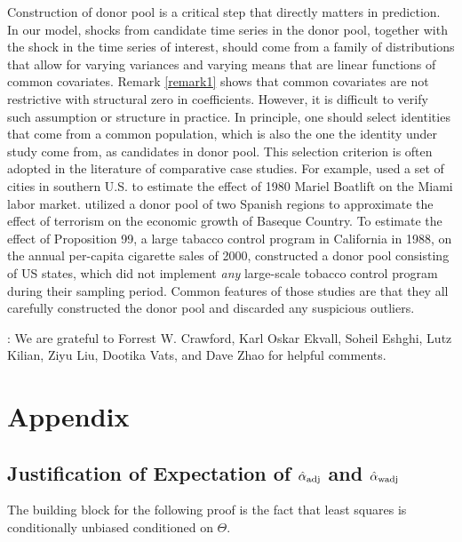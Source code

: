 \documentclass[11pt]{article}
\theoremstyle{definition}
\begin{document}
Construction of donor pool is a critical step that directly matters in prediction. In our model, shocks from candidate time series in the donor pool, together with the shock in the time series of interest, should come from a family of distributions that allow for  varying variances and  varying means that are linear functions of common covariates. Remark \ref{remark1} shows that common covariates are not restrictive with structural zero in coefficients. However, it is difficult to verify such assumption or structure in practice. In principle, one should select identities that come from a common population, which is also the one  the identity under study come from, as candidates in donor pool. This selection criterion is often adopted in the literature of comparative case studies. For example, \citet{card1990impact} used a set of cities in southern U.S. to estimate the effect of 1980 Mariel Boatlift on the Miami labor market. \citet{abadie2003economic} utilized a donor pool of two Spanish regions to approximate the effect of terrorism on  the economic growth of Baseque Country. To estimate the effect of Proposition 99, a large tabacco control program in California  in 1988, on the annual per-capita cigarette sales of 2000, \cite{abadie2010synthetic} constructed a donor pool consisting of US states, which did not implement \emph{any} large-scale tobacco control program during their sampling period. Common features of those studies are that they all carefully constructed the donor pool and discarded any suspicious outliers. 
 
 
 
\vspace*{0.5cm}: We are grateful to Forrest W. Crawford, Karl Oskar Ekvall, Soheil Eshghi, Lutz Kilian, Ziyu Liu, Dootika Vats, and Dave Zhao for helpful comments.

\section{Appendix}
\label{proofs}

\subsection{Justification of Expectation of $\hat{\alpha}_{\rm adj}$ and $\hat{\alpha}_{\rm wadj}$}
\label{exp}

The building block for the following proof is the fact that least squares is conditionally unbiased conditioned on $\Theta$. 
\end{document}
